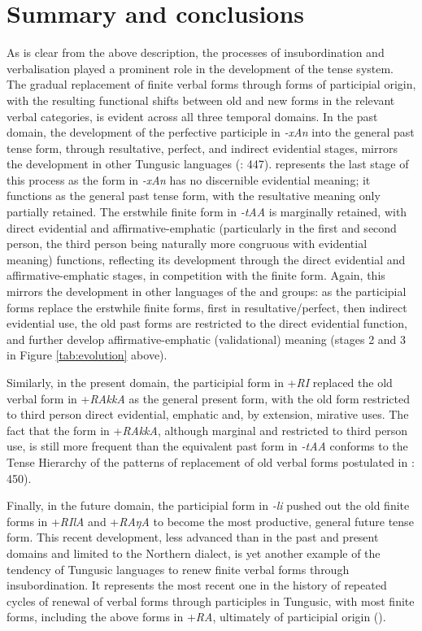 \documentclass[output=paper,colorlinks,citecolor=brown]{langscibook}
\begin{document}
\section{Summary and conclusions}\label{Section3.6}\largerpage

As is clear from the above description, the processes of insubordination and verbalisation played a prominent role in the development of the  tense system. The gradual replacement of finite verbal forms through forms of participial origin, with the resulting functional shifts between old and new forms in the relevant verbal categories, is evident across all three temporal domains. In the past domain, the development of the perfective participle in \textit{-xAn} into the general past tense form, through resultative, perfect, and indirect evidential stages, mirrors the development in other Tungusic languages (\citealt{Malchukov_2000}: 447).  represents the last stage of this process as the form in \textit{-xAn} has no discernible evidential meaning; it functions as the general past tense form, with the resultative meaning only partially retained. The erstwhile finite form in \textit{-tAA} is marginally retained, with direct evidential and affirmative-emphatic (particularly in the first and second person, the third person being naturally more congruous with evidential meaning) functions, reflecting its development through the direct evidential and affirmative-emphatic stages, in competition with the finite form. Again, this mirrors the development in other languages of the  and  groups: as the participial forms replace the erstwhile finite forms, first in resultative/perfect, then indirect evidential use, the old past forms are restricted to the direct evidential function, and further develop affirmative-emphatic (validational) meaning (stages 2 and 3 in Figure \ref{tab:evolution} above).

Similarly, in the present domain, the participial form in +\textit{RI} replaced the old verbal form in +\textit{RAkkA} as the general present form, with the old form restricted to third person direct evidential, emphatic and, by extension, mirative uses. The fact that the form in +\textit{RAkkA}, although marginal and restricted to third person use, is still more frequent than the equivalent past form in \textit{-tAA} conforms to the Tense Hierarchy of the patterns of replacement of old verbal forms postulated in \citealt{Malchukov_2000}: 450).

Finally, in the future domain, the participial form in \textit{-li} pushed out the old finite forms in +\textit{RIlA} and +\textit{RAŋA} to become the most productive, general future tense form. This recent development, less advanced than in the past and present domains and limited to the Northern dialect, is yet another example of the tendency of Tungusic languages to renew finite verbal forms through insubordination. It represents the most recent one in the history of repeated cycles of renewal of verbal forms through participles in Tungusic, with most finite forms, including the above forms in +\textit{RA}, ultimately of participial origin (\citealt{Robbeets_2009}).
\end{document}
